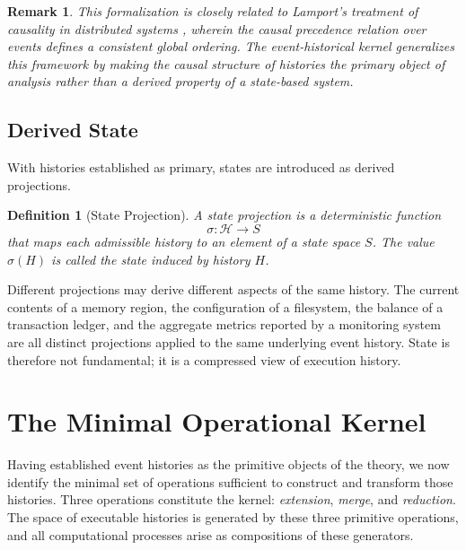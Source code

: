 \documentclass[12pt]{article}
\newtheorem{definition}{Definition}
\newtheorem{remark}{Remark}
\begin{document}
\begin{remark}
This formalization is closely related to Lamport's treatment of causality in distributed
systems \cite{lamport1978}, wherein the causal precedence relation over events defines a
consistent global ordering. The event-historical kernel generalizes this framework by making
the causal structure of histories the primary object of analysis rather than a derived property
of a state-based system.
\end{remark}

\subsection{Derived State}

With histories established as primary, states are introduced as derived projections.

\begin{definition}[State Projection]
A \emph{state projection} is a deterministic function
\[
\sigma : \mathcal{H} \rightarrow S
\]
that maps each admissible history to an element of a \emph{state space} $S$. The value
$\sigma(H)$ is called the \emph{state induced} by history $H$.
\end{definition}

Different projections may derive different aspects of the same history. The current contents
of a memory region, the configuration of a filesystem, the balance of a transaction ledger,
and the aggregate metrics reported by a monitoring system are all distinct projections applied
to the same underlying event history. State is therefore not fundamental; it is a compressed
view of execution history.

\section{The Minimal Operational Kernel}
\label{sec:kernel}

Having established event histories as the primitive objects of the theory, we now identify the
minimal set of operations sufficient to construct and transform those histories. Three operations
constitute the kernel: \emph{extension}, \emph{merge}, and \emph{reduction}. The space of
executable histories is generated by these three primitive operations, and all computational
processes arise as compositions of these generators.
\end{document}

